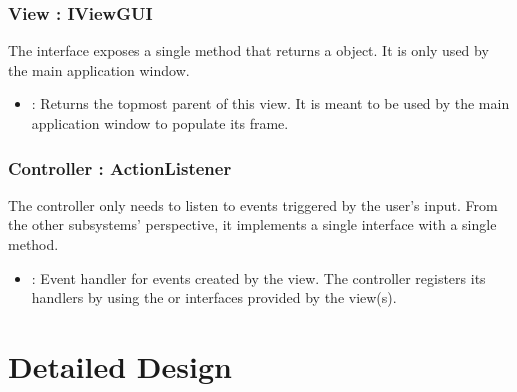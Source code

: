 \documentclass[12pt]{article}
\begin{document}
\subsubsection{View : IViewGUI}
The  interface exposes a single method that returns a  object. It is only used by the main application window.
\begin{itemize}
	\item {} : Returns the topmost parent  of this view. It is meant to be used by the main application window to populate its frame.
\end{itemize}

\subsubsection{Controller : ActionListener}
The controller only needs to listen to events triggered by the user's input. From the other subsystems' perspective, it implements a single interface with a single method.
\begin{itemize}
	\item {} : Event handler for  events created by the view. The controller registers its handlers by using the  or  interfaces provided by the view(s).
\end{itemize}


\newpage
\section{Detailed Design} \label{sec:detail}
\end{document}
